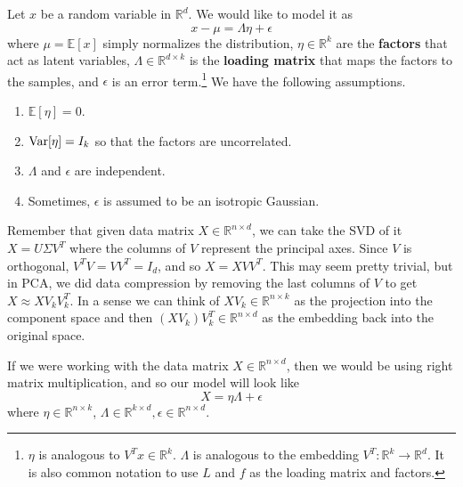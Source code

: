   \begin{definition} 
    Let $x$ be a random variable in $\mathbb{R}^d$. We would like to model it as 
    \begin{equation}
      x - \mu = \Lambda \eta + \epsilon
    \end{equation}
    where $\mu = \mathbb{E}[x]$ simply normalizes the distribution, $\eta \in \mathbb{R}^k$ are the \textbf{factors} that act as latent variables, $\Lambda \in \mathbb{R}^{d \times k}$ is the \textbf{loading matrix} that maps the factors to the samples, and $\epsilon$ is an error term.\footnote{$\eta$ is analogous to $V^T x \in \mathbb{R}^k$. $\Lambda$ is analogous to the embedding $V^T: \mathbb{R}^k \to \mathbb{R}^d$. It is also common notation to use $L$ and $f$ as the loading matrix and factors. } We have the following assumptions. 
    \begin{enumerate}
      \item $\mathbb{E}[\eta] = 0$. 
      \item $\operatorname{Var}[\eta] = I_k$ so that the factors are uncorrelated. 
      \item $\Lambda$ and $\epsilon$ are independent. 
      \item Sometimes, $\epsilon$ is assumed to be an isotropic Gaussian. 
    \end{enumerate}
  \end{definition} 

  Remember that given data matrix $X \in \mathbb{R}^{n \times d}$, we can take the SVD of it $X = U \Sigma V^T$ where the columns of $V$ represent the principal axes. Since $V$ is orthogonal, $V^T V = V V^T = I_d$, and so $X = X V V^T$. This may seem pretty trivial, but in PCA, we did data compression by removing the last columns of $V$ to get $X \approx X V_k V_k^T$. In a sense we can think of $XV_k \in \mathbb{R}^{n \times k}$ as the projection into the component space and then $(X V_k) V_k^T \in \mathbb{R}^{n \times d}$ as the embedding back into the original space. 

  If we were working with the data matrix $X \in \mathbb{R}^{n \times d}$, then we would be using right matrix multiplication, and so our model will look like 
  \begin{equation}
    X = \eta \Lambda + \epsilon
  \end{equation}
  where $\eta \in \mathbb{R}^{n \times k}$, $\Lambda \in \mathbb{R}^{k \times d}, \epsilon \in \mathbb{R}^{n \times d}$. 

